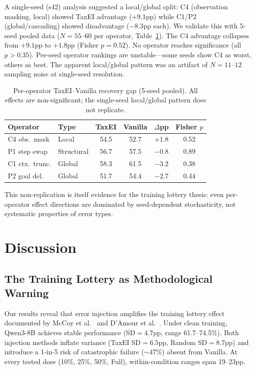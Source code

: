 \documentclass[11pt,a4paper]{article}
\begin{document}
A single-seed (s42) analysis suggested a local/global split: C4 (observation masking, local) showed TaxEI advantage (+9.1pp) while C1/P2 (global/cascading) showed disadvantage ($-8.3$pp each).
We validate this with 5-seed pooled data ($N{=}55$--$60$ per operator, Table~\ref{tab:peroperator}).
The C4 advantage collapses from $+9.1$pp to $+1.8$pp (Fisher $p{=}0.52$).
No operator reaches significance (all $p > 0.35$).
Per-seed operator rankings are unstable---some seeds show C4 as worst, others as best.
The apparent local/global pattern was an artifact of $N{=}11$--$12$ sampling noise at single-seed resolution.

\begin{table}[t]
\centering
\small
\caption{Per-operator TaxEI--Vanilla recovery gap (5-seed pooled). All effects are non-significant; the single-seed local/global pattern does not replicate.}
\label{tab:peroperator}
\begin{tabular}{llcccc}
\toprule
\textbf{Operator} & \textbf{Type} & \textbf{TaxEI} & \textbf{Vanilla} & \textbf{$\Delta$pp} & \textbf{Fisher $p$} \\
\midrule
C4 obs.\ mask & Local & 54.5 & 52.7 & +1.8 & 0.52 \\
P1 step swap & Structural & 56.7 & 57.5 & $-0.8$ & 0.89 \\
C1 ctx.\ trunc. & Global & 58.3 & 61.5 & $-3.2$ & 0.38 \\
P2 goal del. & Global & 51.7 & 54.4 & $-2.7$ & 0.44 \\
\bottomrule
\end{tabular}
\end{table}

This non-replication is itself evidence for the training lottery thesis: even per-operator effect directions are dominated by seed-dependent stochasticity, not systematic properties of error types.

\section{Discussion}
\label{sec:discussion}

\subsection{The Training Lottery as Methodological Warning}

Our results reveal that error injection amplifies the training lottery effect documented by McCoy et al.\ \citeyearpar{mccoy2020} and D'Amour et al.\ \citeyearpar{damour2022}.
Under clean training, Qwen3-8B achieves stable performance (SD${=}4.7$pp, range 61.7--74.5\%).
Both injection methods inflate variance (TaxEI SD${=}6.5$pp, Random SD${=}8.7$pp) and introduce a 1-in-5 risk of catastrophic failure (${\sim}47\%$) absent from Vanilla.
At every tested dose (10\%, 25\%, 50\%, Full), within-condition ranges span 19--23pp.
\end{document}
